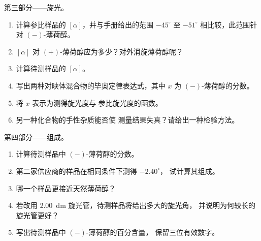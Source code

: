 \begin{problem}
\medskip
第三部分——旋光。
\begin{enumerate}[resume]
  \item 计算参比样品的 $[\alpha]$，并与手册给出的范围
        $-45^\circ$ 至 $-51^\circ$ 相比较，此范围针对 $(-)$-薄荷醇。
  \item $[\alpha]$ 对 $(+)$-薄荷醇应为多少？对外消旋薄荷醇呢？
  \item 计算待测样品的 $[\alpha]$。
  \item 写出两种对映体混合物的毕奥定律表达式，其中 $x$
        为 $(-)$-薄荷醇的分数。
  \item 将 $x$ 表示为测得旋光度与
        参比旋光度的函数。
  \item 另一种化合物的手性杂质能否使
        测量结果失真？请给出一种检验方法。
\end{enumerate}

\medskip
第四部分——组成。
\begin{enumerate}[resume]
  \item 计算待测样品中 $(-)$-薄荷醇的分数。
  \item 第二家供应商的样品在相同条件下测得 $-2.40^\circ$，
        试计算其组成。
  \item 哪一个样品更接近天然薄荷醇？
  \item 若改用 \qty{2.00}{dm} 旋光管，待测样品将给出多大的旋光角，
        并说明为何较长的旋光管更好？
  \item 写出待测样品中 $(-)$-薄荷醇的百分含量，
        保留三位有效数字。
\end{enumerate}
\end{problem}
